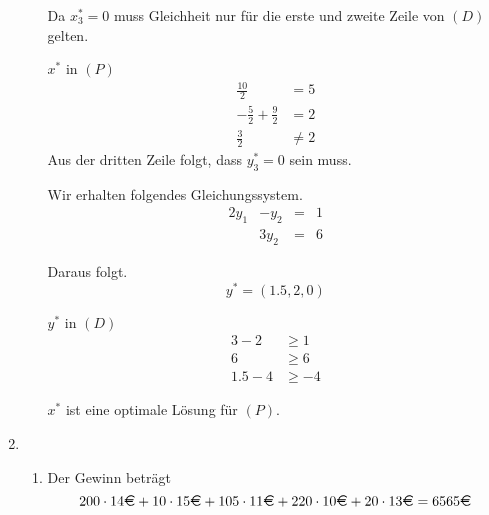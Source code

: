 \documentclass[a4paper]{scrartcl}
\begin{document}
\begin{enumerate}[label=\bfseries\arabic*.]
\begin{enumerate}
                Da $x_3^* = 0$ muss Gleichheit nur für die erste und zweite
                Zeile von $(D)$ gelten.

                $x^*$ in $(P)$
                \begin{equation}
                    \begin{split}
                        \frac{10}{2} &= 5 \\
                        -\frac{5}{2} +\frac{9}{2} &= 2 \\
                        \frac{3}{2} &\neq 2
                    \end{split}
                \end{equation}
                Aus der dritten Zeile folgt, dass $y_3^* = 0$ sein muss.
                
                Wir erhalten folgendes Gleichungssystem.
                \begin{equation}
                    \begin{array}{rrrcr}
                        2y_1 & -y_2 & = & 1 \\
                        & 3y_2 & = & 6
                    \end{array}
                \end{equation}

                Daraus folgt.
                \begin{equation}
                    y^* = \left( 1.5, 2, 0 \right)
                \end{equation}

                $y^*$ in $(D)$
                \begin{equation}
                    \begin{split}
                        3 - 2 &\geq 1 \\
                        6 &\geq 6 \\
                        1.5 -4 &\geq -4
                    \end{split}
                \end{equation}
                
                $x^*$ ist eine optimale Lösung für $(P)$.

        \end{enumerate}

    \item %
        \begin{enumerate}
            \item
                Der Gewinn beträgt
                \begin{equation}
                    200 \cdot 14 \text{\EUR}
                    + 10 \cdot 15 \text{\EUR} + 105 \cdot 11 \text{\EUR}
                    + 220 \cdot 10 \text{\EUR} + 20 \cdot 13 \text{\EUR}
                    =
                    6565 \text{\EUR}
                \end{equation}
                

\end{enumerate}
\end{enumerate}
\end{document}
